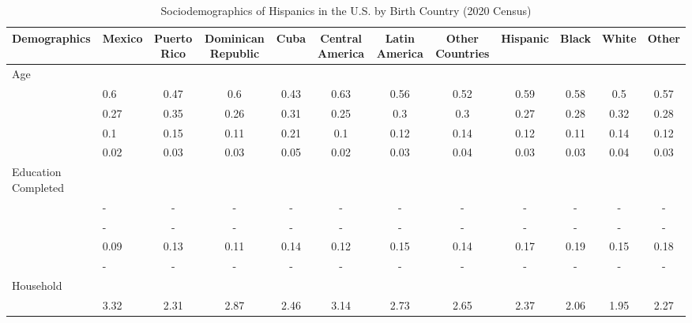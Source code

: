 \begin{table}[ht]
\centering
\caption{Sociodemographics of Hispanics in the U.S. by Birth Country (2020 Census)} 
\begingroup\small
\begin{tabular}{>{\raggedright\arraybackslash}p{3.2cm}|lcccccc|cccc}
  \hline
Demographics & Mexico & Puerto Rico & Dominican Republic & Cuba & Central America & Latin America & Other Countries & Hispanic & Black & White & Other \\ 
  \hline
Age &  &  &  &  &  &  &  &  &  &  &  \\ 
  \multicolumn{1}{>{\raggedleft\arraybackslash}p{1.5cm}|}{\makebox[1.5cm][r]{60 - 69 }}& 0.6 & 0.47 & 0.6 & 0.43 & 0.63 & 0.56 & 0.52 & 0.59 & 0.58 & 0.5 & 0.57 \\ 
  \multicolumn{1}{>{\raggedleft\arraybackslash}p{1.5cm}|}{\makebox[1.5cm][r]{70 - 79 }}& 0.27 & 0.35 & 0.26 & 0.31 & 0.25 & 0.3 & 0.3 & 0.27 & 0.28 & 0.32 & 0.28 \\ 
  \multicolumn{1}{>{\raggedleft\arraybackslash}p{1.5cm}|}{\makebox[1.5cm][r]{80 - 89 }}& 0.1 & 0.15 & 0.11 & 0.21 & 0.1 & 0.12 & 0.14 & 0.12 & 0.11 & 0.14 & 0.12 \\ 
  \multicolumn{1}{>{\raggedleft\arraybackslash}p{1.5cm}|}{\makebox[1.5cm][r]{90 plus }}& 0.02 & 0.03 & 0.03 & 0.05 & 0.02 & 0.03 & 0.04 & 0.03 & 0.03 & 0.04 & 0.03 \\ 
  Education Completed &  &  &  &  &  &  &  &  &  &  &  \\ 
  \multicolumn{1}{>{\raggedleft\arraybackslash}p{3.2cm}|}{\makebox[3.2cm][r]{Less than Primary }}& - & - & - & - & - & - & - & - & - & - & - \\ 
  \multicolumn{1}{>{\raggedleft\arraybackslash}p{1.7cm}|}{\makebox[1.7cm][r]{Primary }}& - & - & - & - & - & - & - & - & - & - & - \\ 
  \multicolumn{1}{>{\raggedleft\arraybackslash}p{2cm}|}{\makebox[2cm][r]{Secondary }}& 0.09 & 0.13 & 0.11 & 0.14 & 0.12 & 0.15 & 0.14 & 0.17 & 0.19 & 0.15 & 0.18 \\ 
  \multicolumn{1}{>{\raggedleft\arraybackslash}p{2cm}|}{\makebox[2cm][r]{University }}& - & - & - & - & - & - & - & - & - & - & - \\ 
  Household &  &  &  &  &  &  &  &  &  &  &  \\ 
  \multicolumn{1}{>{\raggedleft\arraybackslash}p{2.7cm}|}{\makebox[2.7cm][r]{Household Size }}& 3.32 & 2.31 & 2.87 & 2.46 & 3.14 & 2.73 & 2.65 & 2.37 & 2.06 & 1.95 & 2.27 \\ 

\end{tabular}
\end{table}
